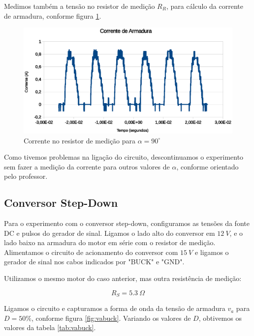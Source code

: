 \documentclass{article}
\begin{document}
Medimos também a tensão no resistor de medição $R_R$, para cálculo da corrente de armadura, conforme figura \ref{fig:iaret}.
\begin{figure}[H]
	\centering
	\includegraphics[width=\linewidth]{Dados/Retificador/corrente}
	\caption{Corrente no resistor de medição para $\alpha=90^\circ$}
	\label{fig:iaret}
\end{figure}

Como tivemos problemas na ligação do circuito, descontinuamos o experimento sem fazer a medição da corrente para outros valores de $\alpha$, conforme orientado pelo professor.

\subsection{Conversor Step-Down}
Para o experimento com o conversor step-down, configuramos as tensões da fonte DC e pulsos do gerador de sinal. Ligamos o lado alto do conversor em $12\ V$, e o lado baixo na armadura do motor em série com o resistor de medição. Alimentamos o circuito de acionamento do conversor com $15\ V$ e ligamos o gerador de sinal nos cabos indicados por "BUCK" e "GND".

Utilizamos o mesmo motor do caso anterior, mas outra resistência de medição:

\begin{equation}
R_S=5.3\ \Omega
\end{equation}

Ligamos o circuito e capturamos a forma de onda da tensão de armadura $v_a$ para $D=50\%$, conforme figura \ref{fig:vabuck}. Variando os valores de $D$, obtivemos os valores da tabela \ref{tab:vabuck}.
\end{document}
